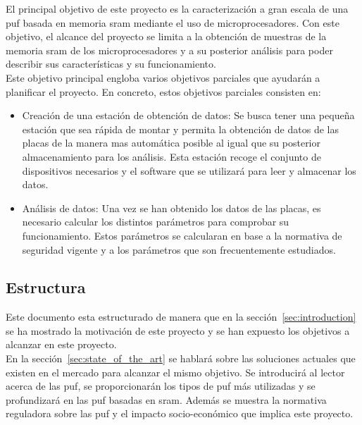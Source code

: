 \documentclass[spanish]{template/minim}
\begin{document}
El principal objetivo de este proyecto es la caracterización a gran escala de una \gls{puf} basada en memoria \gls{sram} mediante el uso de microprocesadores. Con este objetivo, el alcance del proyecto se limita a la obtención de muestras de la memoria \gls{sram} de los microprocesadores y a su posterior análisis para poder describir sus características y su funcionamiento.\\

Este objetivo principal engloba varios objetivos parciales que ayudarán a planificar el proyecto. En concreto, estos objetivos parciales consisten en:\\

\begin{itemize}
    \item {\color{accent}Creación de una estación de obtención de datos}: Se busca tener una pequeña estación que sea rápida de montar y permita la obtención de datos de las placas de la manera mas automática posible al igual que su posterior almacenamiento para los análisis. Esta estación recoge el conjunto de dispositivos necesarios y el software que se utilizará para leer y almacenar los datos.
    \item {\color{accent}Análisis de datos}: Una vez se han obtenido los datos de las placas, es necesario calcular los distintos parámetros para comprobar su funcionamiento. Estos parámetros se calcularan en base a la normativa de seguridad vigente y a los parámetros que son frecuentemente estudiados.
    \end{itemize}

    \subsection{Estructura}\label{sec:structure}

    Este documento esta estructurado de manera que en la sección~\ref{sec:introduction} se ha mostrado la motivación de este proyecto y se han expuesto los objetivos a alcanzar en este proyecto.\\

En la sección~\ref{sec:state_of_the_art} se hablará sobre las soluciones actuales que existen en el mercado para alcanzar el mismo objetivo. Se introducirá al lector acerca de las \gls{puf}, se proporcionarán los tipos de \gls{puf} más utilizadas y se profundizará en las \gls{puf} basadas en \gls{sram}. Además se muestra la normativa reguladora sobre las \gls{puf} y el impacto socio-económico que implica este proyecto.\\
\end{document}
